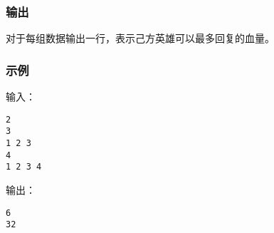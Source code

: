 \subsubsection{输出}
对于每组数据输出一行，表示己方英雄可以最多回复的血量。

\subsubsection{示例}
输入：
\begin{lstlisting}
2
3
1 2 3
4
1 2 3 4
\end{lstlisting}

输出：
\begin{lstlisting}
6
32
\end{lstlisting}

